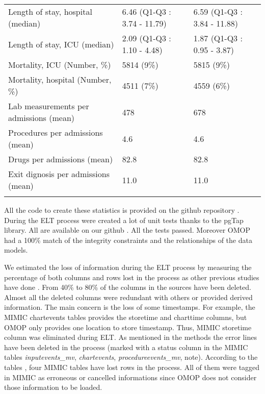 \begin{table*}[t]
\begin{tabular}{@{}lll@{}}
Length of stay, hospital (median)      & 6.46 (Q1-Q3 : 3.74 - 11.79) & 6.59 (Q1-Q3 : 3.84 - 11.88)        \\
Length of stay, ICU (median)           & 2.09 (Q1-Q3 : 1.10 - 4.48)  & 1.87 (Q1-Q3 : 0.95 - 3.87)         \\
Mortality, ICU (Number, \%)            & 5814 (9\%)                  & 5815 (9\%)                         \\
Mortality, hospital (Number, \%)       & 4511 (7\%)                  & 4559 (6\%)                         \\
Lab measurements per admissions (mean) & 478                         & 678                                \\
Procedures per admissions (mean)       & 4.6                         & 4.6                                \\
Drugs per admissions (mean)            & 82.8                        & 82.8                               \\
Exit dignosis per admissions (mean)    & 11.0                        & 11.0                               \\\botrule
\end{tabular}
\label{table:statistics}
\end{table*}

All the code to create these statistics is provided on the github repository
\cite{mimic-omop-website}. During the ELT process were created a lot of unit
tests thanks to the pgTap library. All are available on our github
\cite{mimic-omop-website}. All the tests passed. Moreover OMOP had a 100\%
match of the integrity constraints and the relationships of the data models.

%
%
We estimated the loss of information during the ELT process by measuring the
percentage of both columns and rows lost in the process as other previous
studies have done \cite{omop-nashville}.
From 40\% to 80\% of the columns in the sources have been deleted. Almost
all the deleted columns were redundant with others or provided derived
information. The main concern is the loss of some timestamps. For example, the
MIMIC chartevents tables provides the storetime and charttime columns, but OMOP
only provides one location to store timestamp. Thus, MIMIC storetime column was
eliminated during ELT. As mentioned in the methods the error lines have been
deleted in the process (marked with a status column in the MIMIC tables
\textit{inputevents\_mv}, \textit{chartevents}, \textit{procedureevents\_mv}, note).
According to the tables \cite{lostrows}, four MIMIC tables have lost rows in
the process. All of them were tagged in MIMIC as erroneous or cancelled
informations since OMOP does not consider those information to be loaded.

